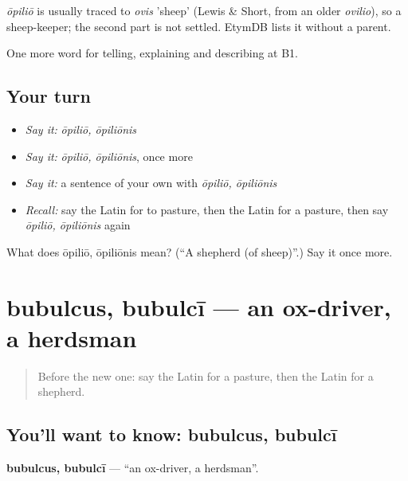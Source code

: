 \begin{cousinweb}
\emph{ōpiliō} is usually traced to \emph{ovis} 'sheep' (Lewis \& Short, from an older \emph{ovilio}), so a sheep-keeper; the second part is not settled. EtymDB lists it without a parent.
\end{cousinweb}

\begin{grammarlens}[title={What you've built}]
One more word for telling, explaining and describing at B1.
\end{grammarlens}

\subsection*{Your turn}
\begin{itemize}
\raggedright
  \item \emph{Say it:} \emph{ōpiliō, ōpiliōnis}
  \item \emph{Say it:} \emph{ōpiliō, ōpiliōnis}, once more
  \item \emph{Say it:} a sentence of your own with \emph{ōpiliō, ōpiliōnis}
  \item \emph{Recall:} say the Latin for to pasture, then the Latin for a pasture, then say \emph{ōpiliō, ōpiliōnis} again
\end{itemize}

\begin{tcolorbox}[breakable,colback=teal!4,colframe=teal!35!black,title={Before you move on}]
What does ōpiliō, ōpiliōnis mean? (\textquotedblleft{}A shepherd (of sheep)\textquotedblright{}.) Say it once more.
\end{tcolorbox}
\section[bubulcus, bubulcī]{bubulcus, bubulcī — an ox-driver, a herdsman}

\label{lesson:LA-C478-bubulcus}



\begin{quote}
Before the new one: say the Latin for a pasture, then the Latin for a shepherd.
\end{quote}

\subsection*{You'll want to know: bubulcus, bubulcī}
\textbf{bubulcus, bubulcī} — \textquotedblleft{}an ox-driver, a herdsman\textquotedblright{}.


